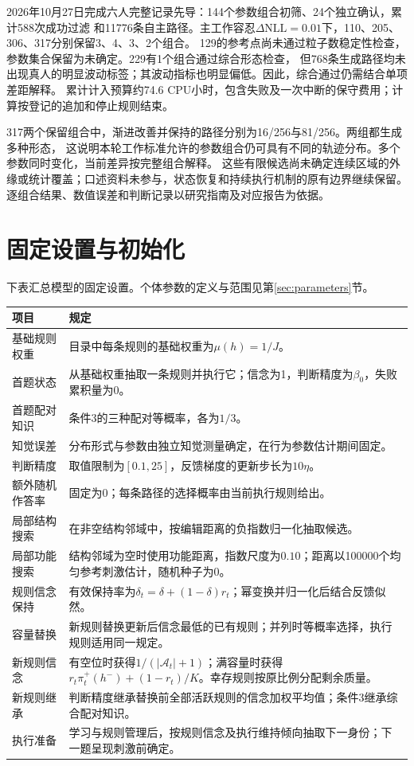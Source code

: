 \documentclass[11pt,a4paper]{article}
\numberwithin{equation}{section}
\newcommand{\A}{\mathcal{A}}
\begin{document}
2026年10月27日完成六人完整记录先导：144个参数组合初筛、24个独立确认，累计588次成功过滤
和11776条自主路径。主工作容忍$\Delta\mathrm{NLL}=0.01$下，110、205、306、317分别保留3、4、3、2个组合。
129的参考点尚未通过粒子数稳定性检查，参数集合保留为未确定。229有1个组合通过综合形态检查，
但768条生成路径均未出现真人的明显波动标签；其波动指标也明显偏低。因此，综合通过仍需结合单项差距解释。
累计计入预算约74.6 CPU小时，包含失败及一次中断的保守费用；计算按登记的追加和停止规则结束。

317两个保留组合中，渐进改善并保持的路径分别为16/256与81/256。两组都生成多种形态，
这说明本轮工作标准允许的参数组合仍可具有不同的轨迹分布。多个参数同时变化，当前差异按完整组合解释。
这些有限候选尚未确定连续区域的外缘或统计覆盖；口述资料未参与，状态恢复和持续执行机制的原有边界继续保留。
逐组合结果、数值误差和判断记录以研究指南及对应报告为依据。

\clearpage
\appendix
\section{固定设置与初始化}
\label{app:settings}

下表汇总模型的固定设置。个体参数的定义与范围见第\ref{sec:parameters}节。

{\small\noindent
\begin{tabularx}{\linewidth}{L{3.3cm}Y}
\toprule
项目 & 规定\\
\midrule
基础规则权重 & 目录中每条规则的基础权重为$\mu(h)=1/J$。\\
首题状态 & 从基础权重抽取一条规则并执行它；信念为1，判断精度为$\beta_0$，失败累积量为0。\\
首题配对知识 & 条件3的三种配对等概率，各为$1/3$。\\
知觉误差 & 分布形式与参数由独立知觉测量确定，在行为参数估计期间固定。\\
判断精度 & 取值限制为$[0.1,25]$，反馈梯度的更新步长为$10\eta$。\\
额外随机作答率 & 固定为0；每条路径的选择概率由当前执行规则给出。\\
局部结构搜索 & 在非空结构邻域中，按编辑距离的负指数归一化抽取候选。\\
局部功能搜索 & 结构邻域为空时使用功能距离，指数尺度为$0.10$；距离以100000个均匀参考刺激估计，随机种子为0。\\
规则信念保持 & 有效保持率为$\delta_t=\delta+(1-\delta)r_t$；幂变换并归一化后结合反馈似然。\\
容量替换 & 新规则替换更新后信念最低的已有规则；并列时等概率选择，执行规则适用同一规定。\\
新规则信念 & 有空位时获得$1/(|\A_t|+1)$；满容量时获得$r_t\pi_t^+(h^-)+(1-r_t)/K$。幸存规则按原比例分配剩余质量。\\
新规则继承 & 判断精度继承替换前全部活跃规则的信念加权平均值；条件3继承综合配对知识。\\
执行准备 & 学习与规则管理后，按规则信念及执行维持倾向抽取下一身份；下一题呈现刺激前确定。\\
\bottomrule
\end{tabularx}}
\end{document}
